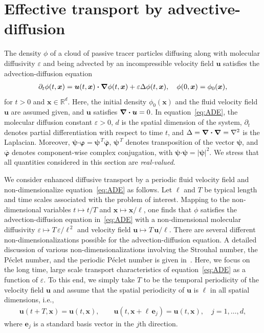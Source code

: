 \documentclass[leqno,onefignum,onetabnum]{siamltex1213}
\newcommand\bnabla{\mbox{\boldmath${\nabla}$}}
\providecommand\bcdot{\boldsymbol{\cdot}}
\newcommand{\vecx}{\boldsymbol{x}}
\newcommand{\vecu}{\boldsymbol{u}}
\newcommand{\vece}{\boldsymbol{e}}
\newcommand{\vecpsi}{\boldsymbol{\psi}}
\newcommand{\vecvarphi}{\boldsymbol{\varphi}}
\begin{document}
\section{Effective transport by
  advective-diffusion} \label{sec:Eff_Trans}    
%
The density $\phi$ of a cloud of passive tracer particles diffusing along
with molecular diffusivity $\varepsilon$ and being advected by an incompressible
velocity field $\vecu$ satisfies the advection-diffusion equation
%
\begin{align}\label{eq:ADE}
  \partial_t\phi(t,\vecx)
    =\vecu (t,\vecx)\bcdot\bnabla \phi(t,\vecx)+\varepsilon\Delta \phi(t,\vecx),
  \quad
  \phi(0,\vecx)=\phi_0(\vecx),  
\end{align}
%
for $t>0$ and $\vecx\in\mathbb{R}^d$.
Here, the initial density $\phi_0(\vecx)$ and the fluid velocity field
$\vecu$ are assumed given, and $\vecu$ satisfies $\bnabla\bcdot\vecu=0$.
In equation~\eqref{eq:ADE}, the molecular diffusion constant $\varepsilon>0$,
$d$ is the spatial dimension of the 
system, $\partial_t$ denotes partial differentiation with respect to time
$t$, and $\Delta=\bnabla\bcdot\bnabla =\nabla^2$ is the Laplacian. Moreover, 
$\vecpsi\bcdot\vecvarphi=\vecpsi^{\,T}\overline{\vecvarphi}$,
$\vecpsi^{\,T}$ denotes transposition of the vector $\vecpsi$, and
$\overline{\vecvarphi}$ denotes component-wise complex conjugation,
with $\vecpsi\bcdot\vecpsi=|\vecpsi|^2$. We stress that all quantities  
considered in this section are \emph{real-valued}. 




We consider enhanced diffusive transport by a periodic fluid velocity
field and non-dimensionalize equation~\eqref{eq:ADE} as follows. Let
$\ell$ and $T$ be typical length and time scales associated with the
problem of interest. Mapping to the non-dimensional variables
$t\mapsto t/T$ and $\vecx\mapsto \vecx/\ell$,
one finds that $\phi$ satisfies the advection-diffusion equation
in~\eqref{eq:ADE} with a non-dimensional molecular diffusivity 
$\varepsilon\mapsto T\,\varepsilon/\ell^{\,2}$ and velocity field $\vecu\mapsto T\,\vecu /\ell$. There are
several different non-dimensionalizations possible 
for the advection-diffusion equation. A detailed discussion of 
various non-dimensionalizations involving the Strouhal number, the
P{\'e}clet number, and the periodic P{\'e}clet number is given
in~\cite{McLaughlin:Forest:PF:1999:880,Majda:Kramer:1999:book}.  Here,
we focus on the long time, large scale transport characteristics of
equation~\eqref{eq:ADE} as a function of $\varepsilon$. To this end, we simply
take $T$ to be the temporal periodicity of the velocity field $\vecu$
and assume that the spatial periodicity of $\vecu$ is $\ell$ in all
spatial dimensions, i.e., 
%
\begin{align}\label{eq:Periodic_u}
  \vecu(t+T,\vecx)=\vecu(t,\vecx), \qquad
  \vecu(t,\vecx+\ell\,\vece_j)=\vecu(t,\vecx), \quad
  j=1,\ldots,d,
\end{align}
%
where $\vece_j$ is a standard basis vector in the $j$th direction. 
\end{document}
